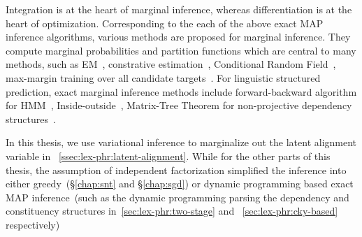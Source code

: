  Integration is at the heart of marginal
inference, whereas differentiation is at the heart of
optimization. Corresponding to the each of the above exact MAP
inference algorithms, various methods are proposed for marginal
inference. They compute marginal probabilities and partition functions
which are central to many methods, such as
EM~\citep{baker1979trainable,weizenbaum1966eliza}, constrative
estimation~\citep{smith2005contrastive}, Conditional Random
Field~\citep[CRF,][]{lafferty01crf}, max-margin training over all
candidate targets~\cite{koller2004max}. For linguistic structured
prediction, exact marginal inference methods include forward-backward
algorithm for HMM~\citep{binder1997space},
Inside-outside~\citep{baker1979trainable}, Matrix-Tree Theorem for
non-projective dependency
structures~\citep{koo-etal-2007-structured,liu2018learning}.

In this thesis, we use variational inference to marginalize out the
latent alignment variable in
~\autoref{ssec:lex-phr:latent-alignment}. While for the other parts of
this thesis, the assumption of independent factorization simplified
the inference into either greedy~(\S\ref{chap:snt} and
\S\ref{chap:sgd}) or dynamic programming based exact MAP
inference~(such as the dynamic programming parsing the dependency and
constituency structures in~\autoref{sec:lex-phr:two-stage} and
~\autoref{sec:lex-phr:cky-based} respectively)

